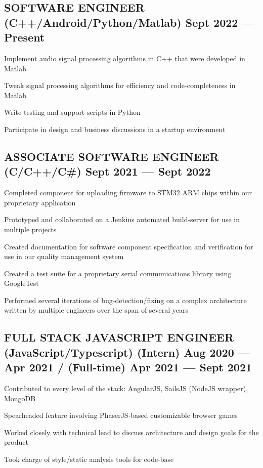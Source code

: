 \documentclass[letter,10pt]{article}
\begin{document}
\subsection{{SOFTWARE ENGINEER (C++/Android/Python/Matlab) \texorpdfstring{\hfill}{\space} Sept 2022 --- Present}}
\begin{zitemize}
    \item Implement audio signal processing algorithms in C++ that were developed in Matlab
    \item Tweak signal processing algorithms for efficiency and code-completeness in Matlab
    \item Write testing and support scripts in Python
    \item Participate in design and business discussions in a startup environment
\end{zitemize}

\subsection{{ASSOCIATE SOFTWARE ENGINEER (C/C++/C\#) \texorpdfstring{\hfill}{\space} Sept 2021 --- Sept 2022}}
\begin{zitemize}
    \item Completed component for uploading firmware to STM32 ARM chips within our proprietary application
    \item Prototyped and collaborated on a Jenkins automated build-server for use in multiple projects
    \item Created documentation for software component specification and verification for use in our quality management system
    \item Created a test suite for a proprietary serial communications library using GoogleTest
    \item Performed several iterations of bug-detection/fixing on a complex architecture written by multiple engineers over the span of several years
\end{zitemize}

\subsection{{FULL STACK JAVASCRIPT ENGINEER (JavaScript/Typescript) \texorpdfstring{\hfill}{\space} (Intern) Aug 2020 --- Apr 2021 / (Full-time) Apr 2021 --- Sept 2021}}
\begin{zitemize}
    \item Contributed to every level of the stack: AngularJS, SailsJS (NodeJS wrapper), MongoDB
    \item Spearheaded feature involving PhaserJS-based customizable browser games
    \item Worked closely with technical lead to discuss architecture and design goals for the product
    \item Took charge of style/static analysis tools for code-base
\end{zitemize}
\end{document}
